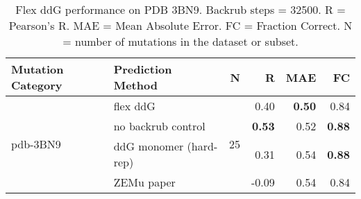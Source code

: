 \begin{table}
  \begin{tabular}{llrrrr}
\toprule
Mutation Category &       Prediction Method &   N &     R &  MAE &   FC \\
\midrule
 \multirow{ 4}{*}{pdb-3BN9} & flex ddG & \multirow{ 4}{*}{25} & 0.40 & \textbf{0.50} & 0.84  \\
 & no backrub control & & \textbf{0.53} & 0.52 & \textbf{0.88}  \\
 & ddG monomer (hard-rep) & & 0.31 & 0.54 & \textbf{0.88}  \\
 & ZEMu paper & & -0.09 & 0.54 & 0.84  \\
\bottomrule
\end{tabular}
  \caption[Flex ddG performance on PDB 3BN9]{
    Flex ddG performance on PDB 3BN9. Backrub steps = 32500. R = Pearson's R. MAE = Mean Absolute Error. FC = Fraction Correct. N = number of mutations in the dataset or subset.
  } \label{tab:table-pdb-3BN9}
\end{table}
